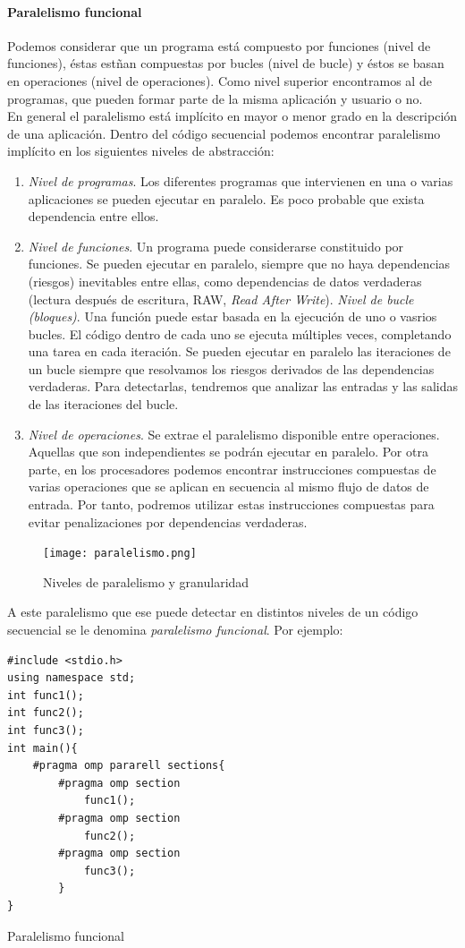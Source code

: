 \documentclass[12pt,spanish]{article}
\begin{document}
\paragraph{Paralelismo funcional}
Podemos considerar que un programa está compuesto por funciones (nivel de funciones), éstas estñan compuestas por bucles (nivel de bucle) y éstos se basan en operaciones (nivel de operaciones). Como nivel superior encontramos al de programas, que pueden formar parte de la misma aplicación y usuario o no.\\
En general el paralelismo está implícito en mayor o menor grado en la descripción de una aplicación. Dentro del código secuencial podemos encontrar paralelismo implícito en los siguientes niveles de abstracción:
\begin{enumerate}
\item \emph{Nivel de programas}. Los diferentes programas que intervienen en una o varias aplicaciones se pueden ejecutar en paralelo. Es poco probable que exista dependencia entre ellos.
\item \emph{Nivel de funciones}. Un programa puede considerarse constituido por funciones. Se pueden ejecutar en paralelo, siempre que no haya dependencias (riesgos) inevitables entre ellas, como dependencias de datos verdaderas (lectura después de escritura, RAW, \textit{Read After Write}).
\emph{Nivel de bucle (bloques)}. Una función puede estar basada en la ejecución de uno o vasrios bucles. El código dentro de cada uno se ejecuta múltiples veces, completando una tarea en cada iteración. Se pueden ejecutar en paralelo las iteraciones de un bucle siempre que resolvamos los riesgos derivados de las dependencias verdaderas. Para detectarlas, tendremos que analizar las entradas y las salidas de las iteraciones del bucle.
\item \emph{Nivel de operaciones}. Se extrae el paralelismo disponible entre operaciones. Aquellas que son independientes se podrán ejecutar en paralelo. Por otra parte, en los procesadores podemos encontrar instrucciones compuestas de varias operaciones que se aplican en secuencia al mismo flujo de datos de entrada. Por tanto, podremos utilizar estas instrucciones compuestas para evitar penalizaciones por dependencias verdaderas.
\end{enumerate}
\begin{figure}[H]
\centering
\texttt{[image: paralelismo.png]}
\caption{Niveles de paralelismo y granularidad}
\end{figure}
A este paralelismo que ese puede detectar en distintos niveles de un código secuencial se le denomina \emph{paralelismo funcional}.
\newpage
Por ejemplo:
\begin{listing}[H]
\begin{verbatim}
#include <stdio.h>
using namespace std;
int func1();
int func2();
int func3();
int main(){
	#pragma omp pararell sections{
		#pragma omp section
			func1();
		#pragma omp section
			func2();
		#pragma omp section
			func3();	
		}
}

\end{verbatim}
\caption{Paralelismo funcional}
\end{listing}
\end{document}
